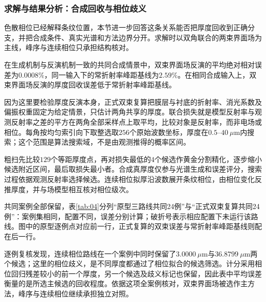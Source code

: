 \subsubsection{求解与结果分析：合成回收与相位歧义}

色散相位已经解释条纹位置，本节进一步回答这条关系能否把厚度回收到正确分支，并把合成条件、真实光谱和方法边界分开。求解时以双角联合的两束界面场为主线，峰序与连续相位只承担结构核对。

在生成机制与反演机制一致的共同合成情景中，双束界面场反演的平均绝对相对误差为$0.0008\%$，同一输入下的常折射率峰距基线为$2.59\%$。在相同合成输入上，双束界面场反演的厚度回收误差低于常折射率峰距基线。

因为这里要检验厚度反演本身，正式双束复算把膜层与衬底的折射率、消光系数及偏振权重固定为给定情景，只估计两角共享的厚度。联合损失就是模型反射率与观测反射率之差的平方在两角全部采样点上取平均，比较对象是反射率，而非电场或相位。每角按均匀索引向下取整选取$256$个原始波数坐标，厚度在$0.5$--$40\ \mu\mathrm{m}$内搜索；这个范围是算法搜索域，不是由观测推得的概率区间。

粗扫先比较$129$个等距厚度点，再对损失最低的$4$个候选作黄金分割精化，逐步缩小候选附近区间，最后取损失最小者。合成真厚度仅参与光谱生成和误差评分，搜索过程依据观测反射率选择候选。连续相位拟厚沿波数展开条纹相位，由相位变化反推厚度，并与场模型相互核对相位级次。

共同案例全部保留，表\ref{tab:04}分列“原型三路线共同24例”与“正式双束复算共同24例”：案例集相同，配置不同，误差分别计算；破折号表示相应配置下未运行该路线。图中的原型逐例点对应前一行，正式复算的双束误差与常折射率峰距基线则配在后一行。

逐例复核发现，连续相位路线在一个案例中同时保留了$3.0000\ \mu\mathrm{m}$与$36.8799\ \mu\mathrm{m}$两个候选；这里的相位歧义，是不同厚度都通过了相位拟合的候选筛选。计分采用相位回归残差较小的前一个厚度，另一个候选及歧义标记也保留，因此表中平均误差衡量的是所选主候选的回收程度。依据这项全案例核对，双束界面场被选作主方法，峰序与连续相位继续承担独立对照。

